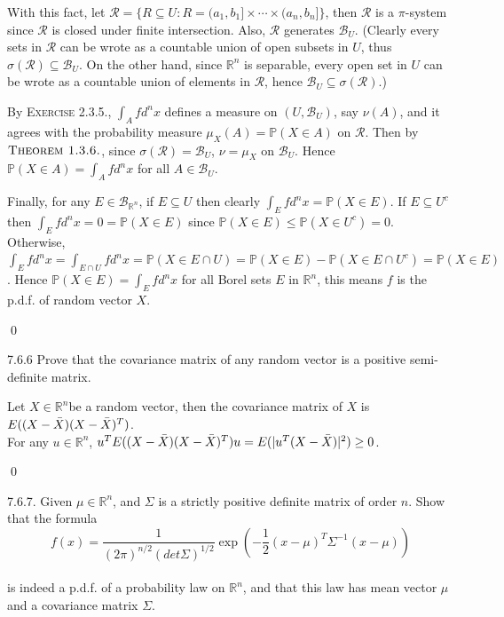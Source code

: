 \begin{answer}
With this fact, let $\mathcal{R}=\{R\subseteq U:R=(a_1,b_1]\times\cdots\times(a_n,b_n]\}$, then $\mathcal{R}$ is a $\pi$-system since $\mathcal{R}$ is closed under finite intersection. Also, $\mathcal{R}$ generates $\mathcal{B}_U$. (Clearly every sets in $\mathcal{R}$ can be wrote as a countable union of open subsets in $U$, thus $\sigma(\mathcal{R})\subseteq\mathcal{B}_U$. On the other hand, since $\mathbb{R}^n$ is separable, every open set in $U$ can be wrote as a countable union of elements in $\mathcal{R}$, hence $\mathcal{B}_U\subseteq\sigma(\mathcal{R})$.)

By \textsc{Exercise 2.3.5.}, $\int_Afd^nx$ defines a measure on $(U,\mathcal{B}_U)$, say $\nu(A)$, and it agrees with the probability measure $\mu_X(A)=\mathbb{P}(X\in A)$ on $\mathcal{R}$. Then by $\textsc{Theorem 1.3.6.}$, since $\sigma(\mathcal{R})=\mathcal{B}_U$, $\nu=\mu_X$ on $\mathcal{B}_U$. Hence $\mathbb{P}(X\in A)=\int_Afd^nx$ for all $A\in\mathcal{B}_U$.

Finally, for any $E\in\mathcal{B}_{\mathbb{R}^n}$, if $E\subseteq U$ then clearly $\int_Efd^nx=\mathbb{P}(X\in E)$. If $E\subseteq U^c$ then $\int_Efd^nx=0=\mathbb{P}(X\in E)$ since $\mathbb{P}(X\in E)\leq\mathbb{P}(X\in U^c)=0$. Otherwise, $\int_Efd^nx=\int_{E\cap U}fd^nx=\mathbb{P}(X\in E\cap U)=\mathbb{P}(X\in E)-\mathbb{P}(X\in E\cap U^c)=\mathbb{P}(X\in E)$. Hence $\mathbb{P}(X\in E)=\int_Efd^nx$ for all Borel sets $E$ in $\mathbb{R}^n$, this means $f$ is the p.d.f. of random vector $X$. 
\end{answer} \qed \qquad

\begin{exercise}7.6.6
Prove that the covariance matrix of any random vector is a positive semi-definite matrix.
\begin{answer}
Let $X \in \mathbb{R}^n $be a random vector, then the covariance matrix of $X$ is $E((X - \Bar{X})(X-\Bar{X})^T)$.
\\For any $u \in \mathbb{R}^n$, $u^TE((X - \Bar{X})(X-\Bar{X})^T)u = E(| u^T(X-\Bar{X})|^2)\geq 0$.
\end{answer}
\qed \qquad
\end{exercise}
\begin{exercise}7.6.7. 
Given $\mu \in \mathbb{R}^n$, and $\Sigma$ is a strictly positive definite matrix of order $n$. Show that the formula
\begin{equation*}
    f(x) = \frac{1}{(2 \pi )^{n/2}(det \Sigma)^{1/2}}\exp\left(-\frac{1}{2}(x-\mu)^T \Sigma^{-1} (x-\mu)\right)
\end{equation*}
\\ is indeed a p.d.f. of a probability law on $\mathbb{R}^{n}$, and that this law has mean vector $\mu$ and a covariance matrix  $\Sigma$.\\
\end{exercise}

